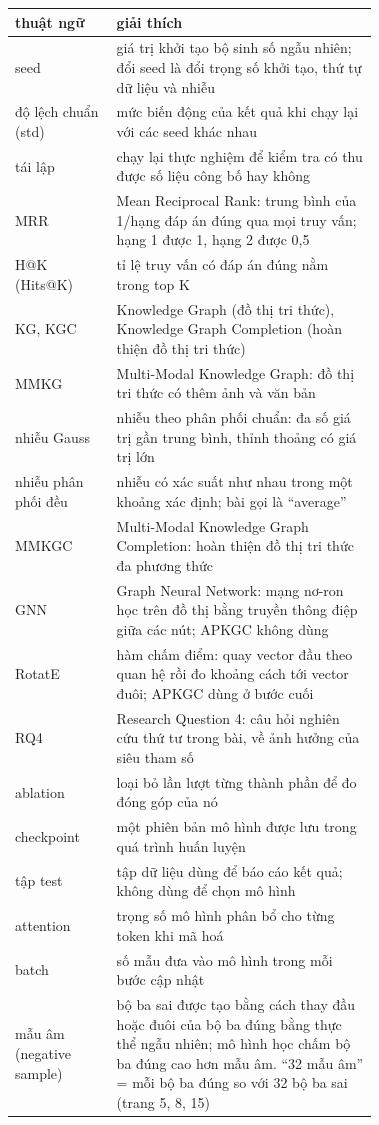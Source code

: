 \documentclass[11pt,a4paper]{article}
\begin{document}
\begin{center}\small
\begin{tabular}{@{}lp{0.72\linewidth}@{}}
\toprule
\textbf{thuật ngữ} & \textbf{giải thích} \\ \midrule
seed & giá trị khởi tạo bộ sinh số ngẫu nhiên; đổi seed là đổi trọng số khởi tạo, thứ tự dữ liệu và nhiễu \\
độ lệch chuẩn (std) & mức biến động của kết quả khi chạy lại với các seed khác nhau \\
tái lập & chạy lại thực nghiệm để kiểm tra có thu được số liệu công bố hay không \\
MRR & Mean Reciprocal Rank: trung bình của 1/hạng đáp án đúng qua mọi truy vấn; hạng 1 được 1, hạng 2 được 0,5 \\
H@K (Hits@K) & tỉ lệ truy vấn có đáp án đúng nằm trong top K \\
KG, KGC & Knowledge Graph (đồ thị tri thức), Knowledge Graph Completion (hoàn thiện đồ thị tri thức) \\
MMKG & Multi-Modal Knowledge Graph: đồ thị tri thức có thêm ảnh và văn bản \\
nhiễu Gauss & nhiễu theo phân phối chuẩn: đa số giá trị gần trung bình, thỉnh thoảng có giá trị lớn \\
nhiễu phân phối đều & nhiễu có xác suất như nhau trong một khoảng xác định; bài gọi là ``average'' \\
MMKGC & Multi-Modal Knowledge Graph Completion: hoàn thiện đồ thị tri thức đa phương thức \\
GNN & Graph Neural Network: mạng nơ-ron học trên đồ thị bằng truyền thông điệp giữa các nút; APKGC không dùng \\
RotatE & hàm chấm điểm: quay vector đầu theo quan hệ rồi đo khoảng cách tới vector đuôi; APKGC dùng ở bước cuối \\
RQ4 & Research Question 4: câu hỏi nghiên cứu thứ tư trong bài, về ảnh hưởng của siêu tham số \\
ablation & loại bỏ lần lượt từng thành phần để đo đóng góp của nó \\
checkpoint & một phiên bản mô hình được lưu trong quá trình huấn luyện \\
tập test & tập dữ liệu dùng để báo cáo kết quả; không dùng để chọn mô hình \\
attention & trọng số mô hình phân bổ cho từng token khi mã hoá \\
batch & số mẫu đưa vào mô hình trong mỗi bước cập nhật \\
mẫu âm (negative sample) & bộ ba sai được tạo bằng cách thay đầu hoặc đuôi của bộ ba đúng bằng thực thể ngẫu nhiên; mô hình học chấm bộ ba đúng cao hơn mẫu âm. ``32 mẫu âm'' = mỗi bộ ba đúng so với 32 bộ ba sai (trang 5, 8, 15) \\

\end{tabular}
\end{center}
\end{document}
